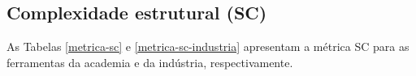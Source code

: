 
\subsection{Complexidade estrutural (SC)}

As Tabelas \ref{metrica-sc} e \ref{metrica-sc-industria} apresentam a
métrica SC para as ferramentas da academia e da indústria, respectivamente.


